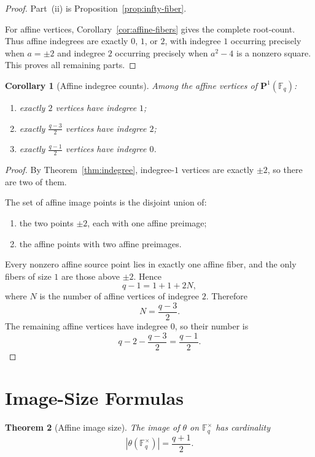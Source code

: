 \documentclass[11pt]{article}
\newtheorem{theorem}{Theorem}
\newtheorem{corollary}[theorem]{Corollary}
\newcommand{\F}{\mathbb{F}}
\newcommand{\Pone}{\mathbf{P}^1}
\begin{document}
\begin{proof}
Part~(ii) is Proposition~\ref{prop:infty-fiber}.

For affine vertices, Corollary~\ref{cor:affine-fibers} gives the complete root-count.
Thus affine indegrees are exactly $0$, $1$, or $2$, with indegree $1$ occurring precisely when $a=\pm2$ and indegree $2$ occurring precisely when $a^2-4$ is a nonzero square.
This proves all remaining parts.
\end{proof}

\begin{corollary}[Affine indegree counts]
\label{cor:indegree-counts}
Among the affine vertices of $\Pone(\F_q)$:
\begin{enumerate}[label=\textup{(\roman*)}]
\item exactly $2$ vertices have indegree $1$;
\item exactly $\frac{q-3}{2}$ vertices have indegree $2$;
\item exactly $\frac{q-1}{2}$ vertices have indegree $0$.
\end{enumerate}
\end{corollary}

\begin{proof}
By Theorem~\ref{thm:indegree}, indegree-$1$ vertices are exactly $\pm2$, so there are two of them.

The set of affine image points is the disjoint union of:
\begin{enumerate}[label=\textup{(\alph*)}]
\item the two points $\pm2$, each with one affine preimage;
\item the affine points with two affine preimages.
\end{enumerate}
Every nonzero affine source point lies in exactly one affine fiber, and the only fibers of size $1$ are those above $\pm2$.
Hence
\[
q-1 = 1+1 + 2N,
\]
where $N$ is the number of affine vertices of indegree $2$.
Therefore
\[
N=\frac{q-3}{2}.
\]
The remaining affine vertices have indegree $0$, so their number is
\[
q-2-\frac{q-3}{2}=\frac{q-1}{2}.
\]
\end{proof}

\section{Image-Size Formulas}

\begin{theorem}[Affine image size]
\label{thm:affine-image}
The image of $\theta$ on $\F_q^\times$ has cardinality
\[
\left|\theta(\F_q^\times)\right|=\frac{q+1}{2}.
\]
\end{theorem}
\end{document}
